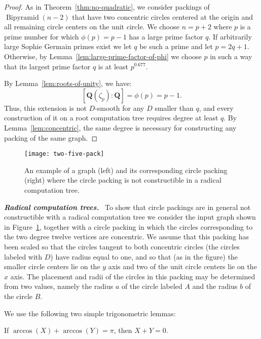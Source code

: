 \documentclass[oribibl,10pt]{llncs}
\newcommand{\rationals}{\mathbf{Q}}
\newcommand{\Emph}[1]{\smallskip\textbf{\textit{#1}}~}
\DeclareMathOperator{\Bipyr}{Bipyramid}
\begin{document}
\begin{appendix}
\begin{proof}
As in Theorem~\ref{thm:no-quadratic},
we consider packings of $\Bipyr (n-2)$ that have two concentric circles centered at the origin and all remaining circle centers on the unit circle. We choose $n=p+2$ where $p$ is a prime number for which $\phi(p)=p-1$ has a large prime factor $q$. If arbitrarily large Sophie Germain primes exist we let $q$ be such a prime and let $p=2q+1$. Otherwise, by Lemma~\ref{lem:large-prime-factor-of-phi} we choose $p$ in such a way that its largest prime factor $q$ is at least $p^{0.677}$.

By Lemma~\ref{lem:roots-of-unity}, we have:
\[ [\rationals (\zeta_{p}) : \rationals] = \phi(p) = p-1. \]
Thus, this extension is not $D$-smooth for any $D$ smaller than $q$, and every construction of it on a root computation tree requires degree at least $q$.
By Lemma~\ref{lem:concentric}, the same degree is necessary for constructing any packing of the same graph.
\end{proof}

\begin{figure}
\centering
\texttt{[image: two-five-pack]}
\caption{An example of a graph (left) and its corresponding circle packing (right) where the circle packing is not constructible in a radical computation tree.}
\label{fig:two-five-graph}
\end{figure}

\Emph{Radical computation trees.} To show that circle packings are in general not constructible with a radical computation tree we consider the input graph shown in Figure~\ref{fig:two-five-graph},  together with a circle packing in which the circles corresponding to the two degree twelve vertices are concentric. We assume that this packing has been scaled so that the circles tangent to both concentric circles (the circles labeled with $D$) have radius equal to one, and so that (as in the figure) the smaller circle centers lie on the $y$ axis and two of the unit circle centers lie on the $x$ axis. The placement and radii of the circles in this packing may be determined from two values, namely the radius $a$ of the circle labeled $A$ and the radius $b$ of the circle $B$.

We use the following two simple trigonometric lemmas:

\begin{lemma}\label{lem:twin-circles}
If $\arccos(X) + \arccos(Y) = \pi$, then $X+Y=0$.
\end{lemma}


\end{appendix}
\end{document}
